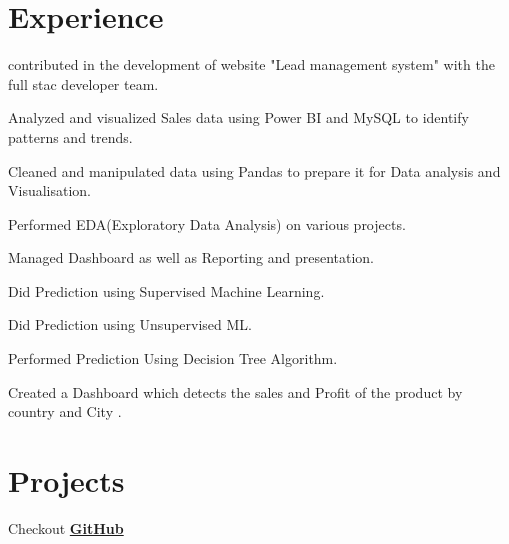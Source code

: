 \documentclass[]{deedy-resume-openfont}
\begin{document}
\begin{minipage}[t]{0.66\textwidth} 


\section{Experience}
\sectionsep
{}
\vspace{\topsep}
\begin{tightemize}
\item contributed in the development of website "Lead management system" with the full stac developer team.
\item Analyzed and visualized Sales data using Power BI and MySQL to identify patterns and trends. 
\item Cleaned and manipulated data using Pandas to prepare it for Data analysis and Visualisation.
\item Performed EDA(Exploratory Data Analysis) on various projects. 
\item Managed Dashboard as well as Reporting and presentation.
\end{tightemize}
\sectionsep





\begin{tightemize}
\item Did Prediction using Supervised Machine Learning.
\item Did Prediction using Unsupervised ML.
\item Performed Prediction Using Decision Tree Algorithm.
\item Created a Dashboard which detects the sales and Profit of the product by country and City .
\end{tightemize}
\sectionsep

\section{Projects}
Checkout \textbf{\href{https://github.com/PratyushSingh1}{GitHub}} 
\sectionsep


\end{minipage}
\end{document}
